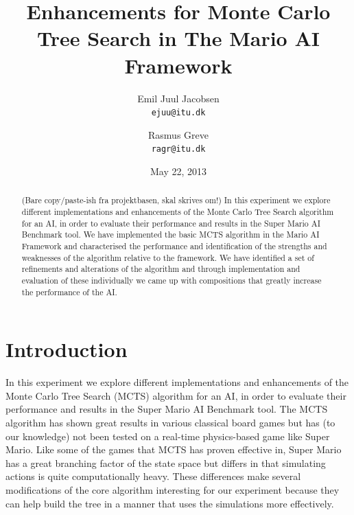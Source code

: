 \documentclass[10pt,a4paper]{article}
\begin{document}
\title{Enhancements for Monte Carlo Tree Search in The Mario AI Framework}
\date{May 22, 2013}
\author{Emil Juul Jacobsen\\\texttt{ejuu@itu.dk}        
        \and Rasmus Greve\\\texttt{ragr@itu.dk}}
\maketitle
\thispagestyle{empty} %

\begin{abstract}
(Bare copy/paste-ish fra projektbasen, skal skrives om!) %
In this experiment we explore different implementations and enhancements of the Monte Carlo Tree Search algorithm for an AI, in order to evaluate their performance and results in the Super Mario AI Benchmark tool. 
We have implemented the basic MCTS algorithm in the Mario AI 
Framework and characterised the performance and identification of 
the strengths and weaknesses of the algorithm relative to the 
framework. We have identified a set of refinements and alterations of the algorithm 
and through implementation and evaluation of these individually we came up
with compositions that greatly increase the performance of the AI.
\end{abstract}
\clearpage

\section{Introduction}
In this experiment we explore different implementations and enhancements of the Monte Carlo Tree Search (MCTS) algorithm for an AI, in order to evaluate their performance and results in the Super Mario AI Benchmark tool. The MCTS algorithm has shown great results in various classical board games but has (to our knowledge) not been tested on a real-time physics-based game like Super Mario. Like some of the games that MCTS has proven effective in, Super Mario has a great branching factor of the state space but differs in that simulating actions is quite computationally heavy. These differences make several modifications of the core algorithm interesting for our experiment because they can help build the tree in a manner that uses the simulations more effectively. %
\clearpage
\end{document}
